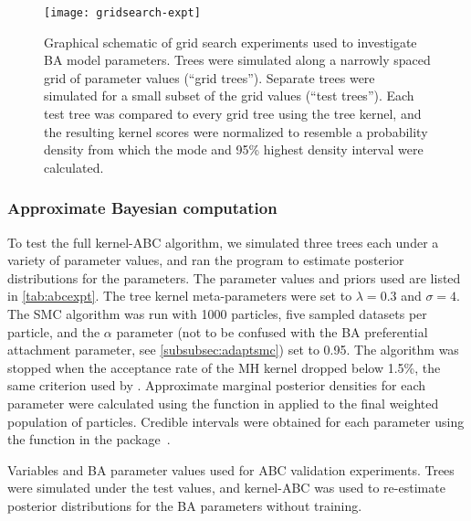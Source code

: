 \begin{figure}[ht]
  \centering
  \texttt{[image: gridsearch-expt]}
  \caption[Schematic of grid search experiment.]{
    Graphical schematic of grid search experiments used to investigate \gls{BA}
    model parameters. Trees were simulated along a narrowly spaced grid of
    parameter values (``grid trees''). Separate trees were simulated for a
    small subset of the grid values (``test trees''). Each test tree was
    compared to every grid tree using the tree kernel, and the resulting kernel
    scores were normalized to resemble a probability density from which the
    mode and 95\% highest density interval were calculated.
  }
  \label{fig:gridexpt}
\end{figure}

\subsubsection*{Approximate Bayesian computation}

To test the full kernel-\gls{ABC} algorithm, we simulated three trees each under
a variety of parameter values, and ran the  program to
estimate posterior distributions for the parameters. The parameter values and
priors used are listed in \cref{tab:abcexpt}. The tree kernel meta-parameters
were set to $\lambda = 0.3$ and $\sigma = 4$. The \gls{SMC} algorithm was run
with 1000 particles, five sampled datasets per particle, and the $\alpha$
parameter (not to be confused with the \gls{BA} preferential attachment
parameter, see \cref{subsubsec:adaptsmc}) set to 0.95. The algorithm was
stopped when the acceptance rate of the \gls{MH} kernel dropped below 1.5\%,
the same criterion used by \citeauthor{del2012adaptive}. Approximate marginal
posterior densities for each parameter were calculated using the
 function in  applied to the final weighted
population of particles. Credible intervals were obtained for each parameter
using the  function in the 
package~\autocite{plummer2006coda}.

\begin{table}[ht]
  \centering
  
  \caption[Variables used in grid search experiments]
  {
    Variables and \gls{BA} parameter values used for \gls{ABC} validation
    experiments. Trees were simulated under the test values, and
    kernel-\gls{ABC} was used to re-estimate posterior distributions for the
    \gls{BA} parameters without training.
  }
  \label{tab:abcexpt}
\end{table}

